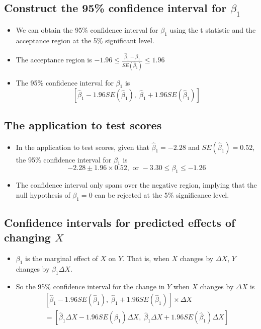 \documentclass[presentation]{beamer}
\begin{document}
\subsection*{Construct the 95\% confidence interval for \(\beta_1\)}
\label{sec:org39f1c31}

\begin{itemize}
\item We can obtain the 95\% confidence interval for \(\beta_1\) using the t
statistic and the acceptance region at the 5\% significant level.

\item The acceptance region is \(-1.96 \leq \frac{\hat{\beta}_1 - \beta_1}{SE(\hat{\beta}_1)} \leq 1.96\)

\item The 95\% confidence interval for \(\beta_1\) is
\[ \left[ \hat{\beta}_1 - 1.96 SE(\hat{\beta}_1),\; \hat{\beta}_1 + 1.96
  SE(\hat{\beta}_1) \right] \]
\end{itemize}

\subsection*{The application to test scores}
\label{sec:orgf8980c1}

\begin{itemize}
\item In the application to test scores, given that \(\hat{\beta}_1 = -2.28\)
and \(SE(\hat{\beta}_1) = 0.52\), the 95\% confidence interval for
\(\beta_1\) is
$${-2.28 \pm 1.96 \times 0.52}, \text{ or } -3.30 \leq \beta_1
  \leq -1.26$$

\item The confidence interval only spans over the negative region,
implying that the null hypothesis of \(\beta_1 = 0\) can be rejected
at the 5\% significance level.
\end{itemize}

\subsection*{Confidence intervals for predicted effects of changing \(X\)}
\label{sec:org33a0709}

\begin{itemize}
\item \(\beta_1\) is the marginal effect of \(X\) on \(Y\). That is, when \(X\)
changes by \(\Delta X\), \(Y\) changes by \(\beta_1 \Delta X\).

\item So the 95\% confidence interval for the change in \(Y\) when \(X\)
changes by \(\Delta X\) is
\begin{gather*}
\left[ \hat{\beta}_1 - 1.96 SE(\hat{\beta}_1)  ,\;
\hat{\beta}_1  + 1.96SE(\hat{\beta}_1) \right] \times \Delta X \\
= \left[ \hat{\beta}_1 \Delta X - 1.96 SE(\hat{\beta}_1) \Delta X,\;
\hat{\beta}_1 \Delta X + 1.96SE(\hat{\beta}_1) \Delta X \right]
\end{gather*}
\end{itemize}
\end{document}
